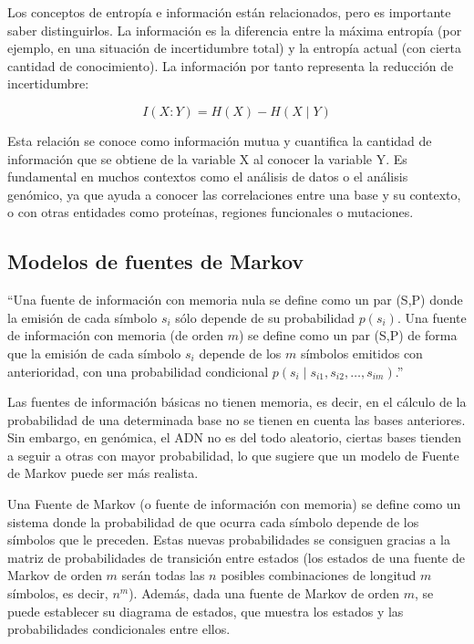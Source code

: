 \documentclass[11pt,spanish,listoffigures,listoftables]{tfgetsinf}
\begin{document}
Los conceptos de entropía e información están relacionados, pero es importante saber distinguirlos. La información es la diferencia entre la máxima entropía (por ejemplo, en una situación de incertidumbre total) y la entropía actual (con cierta cantidad de conocimiento). La información por tanto representa la reducción de incertidumbre:

\[
I(X:Y) = H(X) - H(X \mid Y)
\]

Esta relación se conoce como información mutua y cuantifica la cantidad de información que se obtiene de la variable X al conocer la variable Y. Es fundamental en muchos contextos como el análisis de datos o el análisis genómico, ya que ayuda a conocer las correlaciones entre una base y su contexto, o con otras entidades como proteínas, regiones funcionales o mutaciones. 


\subsection{Modelos de fuentes de Markov}

“Una fuente de información con memoria nula se define como un par (S,P) donde la emisión de cada símbolo \( s_i \) sólo depende de su probabilidad \( p(s_i) \). Una fuente de información con memoria (de orden \( m \)) se define como un par (S,P) de forma que la emisión de cada símbolo \( s_i \) depende de los \( m \) símbolos emitidos con anterioridad, con una probabilidad condicional \( p(s_i \mid s_{i1}, s_{i2}, \dots, s_{im}) \).”\cite[p.~19]{ROB}

Las fuentes de información básicas no tienen memoria, es decir, en el cálculo de la probabilidad de una determinada base no se tienen en cuenta las bases anteriores. Sin embargo, en genómica, el \acs{ADN} no es del todo aleatorio, ciertas bases tienden a seguir a otras con mayor probabilidad, lo que sugiere que un modelo de Fuente de Markov puede ser más realista. 


Una Fuente de Markov (o fuente de información con memoria) se define como un sistema donde la probabilidad de que ocurra cada símbolo depende de los símbolos que le preceden. Estas nuevas probabilidades se consiguen gracias a la matriz de probabilidades de transición entre estados (los estados de una fuente de Markov de orden \( m \) serán todas las \( n \) posibles combinaciones de longitud \( m \) símbolos, es decir, \( n^m \)). Además, dada una fuente de Markov de orden \( m \), se puede establecer su diagrama de estados, que muestra los estados y las probabilidades condicionales entre ellos\cite[p.~20]{ROB}.
\end{document}
